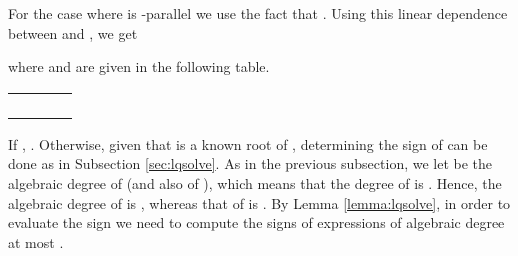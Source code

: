 \documentclass[letterpaper,11pt]{article}
\begin{document}
{For the case where  is -parallel we use the fact that
. Using this
linear dependence between  and , we get

where  and  are given in the following table.
\begin{center}
\begin{tabular}{|c|c|c|c|}\hline 
    &&&\\\hline\hline
    \multirow{2}{*}{}
    &&&\\\cline{2-4}
    &&&\\\hline
    \multirow{2}{*}{}
    &&&\\\cline{2-4}
    &&&\\\hline 
  \end{tabular}
\end{center}
If ,
.
Otherwise, given that  is a known root of ,
determining the sign of  can be done as in Subsection
\ref{sec:lqsolve}. As in the previous subsection, we let
 be the algebraic degree of  (and also of
), which means that the degree of  is
. Hence, the algebraic degree of  is
, whereas that of  is
. By Lemma
\ref{lemma:lqsolve}, in order to evaluate the sign  we
need to compute the signs of expressions of algebraic degree at most
.


\begin{comment}
Having made the above observations, we conclude that, if  is
-axis parallel,
,
where  and  are given in Table \ref{table:QSisXpar}.
Since  is a root of , determining the sign
of  is equivalent to determining the signs of
 and .
Evaluating  and  at , we get

Since the algebraic degrees of  and  are 0 and 1,
respectively, we deduce that determining the sign of
, or equivalently the sign of
, reduces to determining the sign of
a quantity of algebraic degree . Analogously, the
algebraic degree of  is , which suggests
that computing the sign of  requires the
computation of the signs of algebraic expressions of degrees up to
.

\begin{table}[ht]
\begin{center}
\begin{tabular}{|c|c|c|c|}
\hline 
 & 
& \multicolumn{2}{c|}{} \\ 
\hline 
\multirow{2}{*}{} &  &  &  \\ \cline{2-4}
&  &  &   \\ \hline
\multirow{2}{*}{} &   &  &  \\ \cline{2-4}
&  &  &  \\
\hline 
\end{tabular} 
\end{center}
\caption{Expression for , when  is
  -axis parallel.}\label{table:QSisXpar}
\end{table}



\end{comment}}
\end{document}
